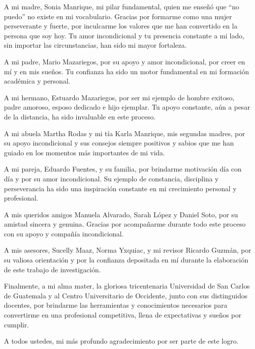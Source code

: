 \documentclass[11pt,letterpaper]{report}
\begin{document}
A mi madre, Sonia Manrique, mi pilar fundamental, quien me enseñó que ``no
puedo'' no existe en mi vocabulario. Gracias por formarme como una mujer
perseverante y fuerte, por inculcarme los valores que me han convertido en la 
persona que soy hoy. Tu amor incondicional y tu presencia constante a mi lado, 
sin importar las circunstancias, han sido mi mayor fortaleza.

A mi padre, Mario Mazariegos, por su apoyo y amor incondicional, por creer en 
mí y en mis sueños. Tu confianza ha sido un motor fundamental en mi formación 
académica y personal.

A mi hermano, Estuardo Mazariegos, por ser mi ejemplo de hombre exitoso, padre 
amoroso, esposo dedicado e hijo ejemplar. Tu apoyo constante, aún a pesar de 
la distancia, ha sido invaluable en este proceso.

A mi abuela Martha Rodas y mi tía Karla Manrique, mis segundas madres, por su 
apoyo incondicional y sus consejos siempre positivos y sabios que me han 
guiado en los momentos más importantes de mi vida.

A mi pareja, Eduardo Fuentes, y su familia, por brindarme motivación día con 
día y por su amor incondicional. Su ejemplo de constancia, disciplina y 
perseverancia ha sido una inspiración constante en mi crecimiento personal y 
profesional.

A mis queridos amigos Manuela Alvarado, Sarah López y Daniel Soto, por su 
amistad sincera y genuina. Gracias por acompañarme durante todo este proceso 
con su apoyo y compañía incondicional.

A mis asesores, Sucelly Maaz, Norma Yxquiac, y mi revisor Ricardo Guzmán, por su
valiosa orientación y por la confianza depositada en mí durante la elaboración
de este trabajo de investigación.

Finalmente, a mi alma mater, la gloriosa tricentenaria Universidad de San 
Carlos de Guatemala y al Centro Universitario de Occidente, junto con sus 
distinguidos docentes, por brindarme las herramientas y conocimientos 
necesarios para convertirme en una profesional competitiva, llena de 
expectativas y sueños por cumplir.

A todos ustedes, mi más profundo agradecimiento por ser parte de este logro.


\end{document}
